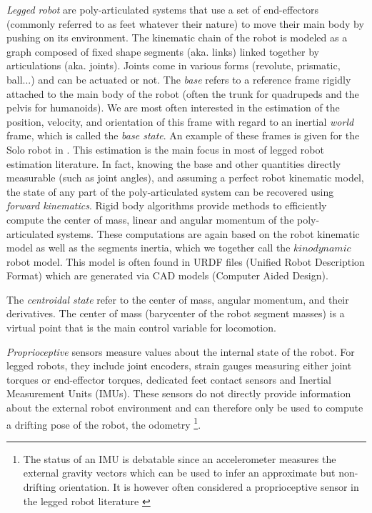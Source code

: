 \textit{Legged robot} are poly-articulated systems that use a set of end-effectors (commonly referred to as feet whatever their nature) to move their main body
by pushing on its environment. The kinematic chain of the robot is modeled as a graph composed of fixed shape segments (aka. links) 
linked together by articulations (aka. joints). Joints come in various forms (revolute, prismatic, ball...) and can be actuated or not.
The \textit{base} refers to a reference frame rigidly attached to the main body of the robot (often the trunk for quadrupeds and the pelvis for humanoids). 
We are most often interested in the estimation of the position, velocity, and orientation of this frame with regard to an inertial \textit{world} frame, which is called the \textit{base state}. 
An example of these frames is given for the Solo robot in .
This estimation is the main focus in most of legged robot estimation literature. In fact, knowing the base and other quantities directly measurable (such as joint angles), 
and assuming a perfect robot kinematic model, the state of any part of the poly-articulated system can be recovered using \textit{forward kinematics}. Rigid body algorithms
\cite{featherstone2014rigid} provide methods to efficiently compute the center of mass, linear and angular momentum of the  poly-articulated systems. These computations
are again based on the robot kinematic model as well as the segments inertia, which we together call the $kinodynamic$ robot model. This model is often 
found in URDF files (Unified Robot Description Format) which are generated via CAD models (Computer Aided Design).

The \textit{centroidal state} refer to the center of mass, angular momentum, and their derivatives. The center 
of mass (barycenter of the robot segment masses) is a virtual point that is the main control variable for locomotion. 

\textit{Proprioceptive} sensors measure values about the internal state of the robot. For legged robots, they include joint encoders, strain gauges measuring 
either joint torques or end-effector torques, dedicated feet contact sensors and Inertial Measurement Units (IMUs). These sensors do not directly provide information
about the external robot environment and can therefore only be used to compute a drifting pose of the robot, the odometry \footnote{The status of an IMU is debatable
since an accelerometer measures the external gravity vectors which can be used to infer an approximate but non-drifting orientation. It is however often considered 
a proprioceptive sensor in the legged robot literature \cite{rotella2018unsupervised,scona2017direct,yang2019state,lin2021deep}}. 

